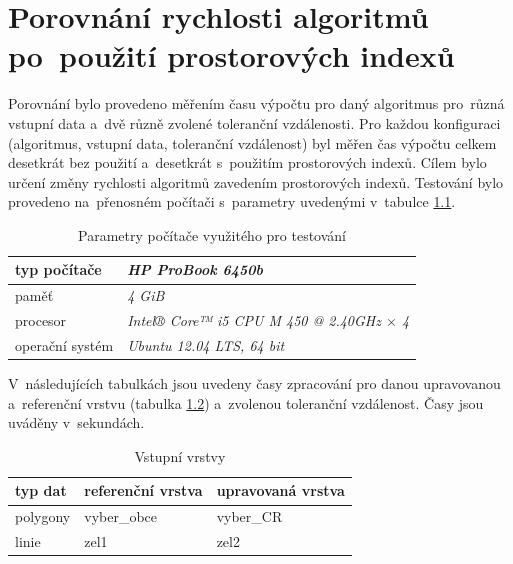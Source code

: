 \chapter[Porovnání rychlosti algoritmů]{Porovnání rychlosti algoritmů po~použití prostorových indexů}
\label{priloha-testovani}

Porovnání bylo provedeno měřením času výpočtu pro daný algoritmus
pro~různá vstupní data a~dvě různě zvolené toleranční vzdálenosti.
Pro každou konfiguraci (algoritmus, vstupní data, toleranční vzdálenost)
byl měřen čas výpočtu celkem desetkrát bez použití a~desetkrát s~použitím
prostorových indexů. Cílem bylo určení změny rychlosti algoritmů zavedením
prostorových indexů. Testování bylo provedeno na~přenosném počítači 
s~parametry uvedenými v~tabulce \ref{tab:parametry}. 

\vspace{10pt}
\begin{table}[H]
 \centering
  \caption{Parametry počítače využitého pro testování}
\begin{tabular}{|l|l|}
\hline
 typ počítače & \textit{HP ProBook 6450b} \\
\hline
 paměť & \textit{4 GiB} \\
\hline
 procesor &\textit{Intel® Core™ i5 CPU M 450 @ 2.40GHz $\times$ 4 }\\
\hline
 operační systém &\textit{Ubuntu 12.04 LTS, 64 bit}\\
\hline
\end{tabular}
  \label{tab:parametry}
\end{table}

\vspace{10pt}
V~následujících tabulkách jsou uvedeny časy zpracování pro danou upravovanou
a~referenční vrstvu (tabulka \ref{tab:vstup}) a~zvolenou toleranční vzdálenost. 
Časy jsou uváděny v~sekundách. 

\vspace{10pt}
\begin{table}[H]
 \centering
  \caption{Vstupní vrstvy}
\begin{tabular}{|l|l|l|}
\hline
 typ dat & referenční vrstva & upravovaná vrstva \\
\hline
\hline
 polygony & vyber\_obce & vyber\_CR \\
 linie & zel1 & zel2 \\
 \hline
\end{tabular}
  \label{tab:vstup}
\end{table}


